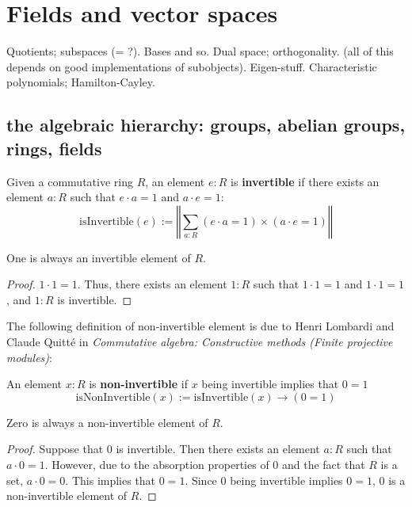 \chapter{Fields and vector spaces}
\label{ch:fields}

Quotients; subspaces (= ?). Bases and so. Dual space; orthogonality. (all of this depends on good implementations of subobjects). Eigen-stuff. Characteristic polynomials; Hamilton-Cayley.
\section{the algebraic hierarchy: groups, abelian groups, rings, fields}

\begin{definition}
Given a commutative ring $R$, an element $e:R$ is \textbf{invertible} if there exists an element $a:R$ such that $e \cdot a = 1$ and $a \cdot e = 1$:
$$\mathrm{isInvertible}(e) := \left\Vert\sum_{a:R} (e \cdot a = 1) \times (a \cdot e = 1)\right\Vert$$
\end{definition}

\begin{theorem}
One is always an invertible element of $R$. 
\end{theorem}

\begin{proof}
$1 \cdot 1 = 1$. Thus, there exists an element $1:R$ such that $1 \cdot 1 = 1$ and $1 \cdot 1 = 1$, and $1:R$ is invertible. 
\end{proof}

The following definition of non-invertible element is due to Henri Lombardi and Claude Quitté in \textit{Commutative algebra: Constructive methods (Finite projective modules)}: 
\begin{definition}
An element $x:R$ is \textbf{non-invertible} if $x$ being invertible implies that $0 = 1$
$$\mathrm{isNonInvertible}(x) := \mathrm{isInvertible}(x) \to (0 = 1)$$
\end{definition}

\begin{theorem}
Zero is always a non-invertible element of $R$. 
\end{theorem}

\begin{proof}
Suppose that $0$ is invertible. Then there exists an element $a:R$ such that $a \cdot 0 = 1$. However, due to the absorption properties of $0$ and the fact that $R$ is a set, $a \cdot 0 = 0$. This implies that $0 = 1$. Since $0$ being invertible implies $0 = 1$, $0$ is a non-invertible element of $R$. 
\end{proof}

